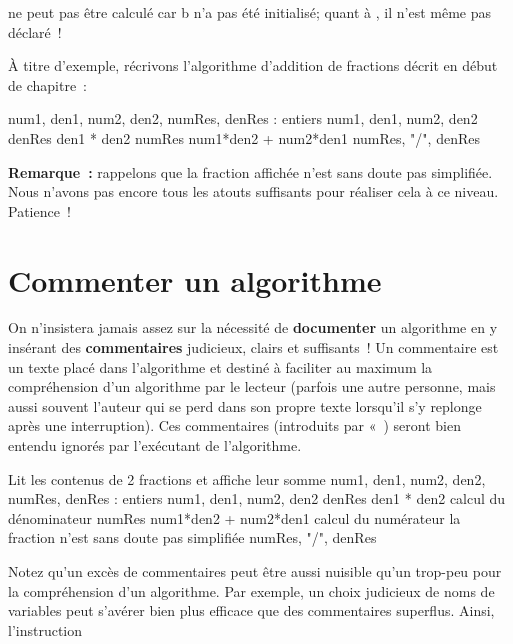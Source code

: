 		 ne peut pas être calculé car b n’a pas été initialisé;
		quant à , il n’est même pas déclaré~!

		\bigskip
			
		À titre d’exemple, récrivons l’algorithme d’addition de fractions décrit
		en début de chapitre~:

		\begin{Pseudocode}
			\Decl num1, den1, num2, den2, numRes, denRes : entiers
			\Read num1, den1, num2, den2
			\Let denRes \Gets den1 * den2
			\Let numRes \Gets num1*den2 + num2*den1
			\Write numRes, "/", denRes
		\EndModule
		\end{Pseudocode}
		
		\textbf{Remarque~:}
		rappelons que la fraction affichée n’est sans doute pas simplifiée. 
		Nous n’avons pas encore tous les atouts suffisants pour réaliser 
		cela à ce niveau. Patience~!

	\section{Commenter un algorithme}

		On n’insistera jamais assez sur la nécessité de \textbf{documenter} un
		algorithme en y insérant des \textbf{commentaires} judicieux, clairs et
		suffisants~! Un commentaire est un texte placé dans
		l’algorithme et destiné à faciliter au maximum la
		compréhension d’un algorithme par le lecteur (parfois une autre
		personne, mais aussi souvent l’auteur qui se perd dans
		son propre texte lorsqu’il s’y replonge après une
		interruption). Ces commentaires (introduits par
		«~) seront bien entendu ignorés par
		l’exécutant de l’algorithme.

		\begin{Pseudocode}
		\LComment Lit les contenus de 2 fractions et affiche leur somme
		\Module{additionnerFractions}{}{}
			\Decl num1, den1, num2, den2, numRes, denRes : entiers
			\Read num1, den1, num2, den2
			\Let denRes \Gets den1 * den2
				\RComment calcul du dénominateur
			\Let numRes \Gets num1*den2 + num2*den1
				\RComment calcul du numérateur
			\Empty \RComment la fraction n’est sans doute pas simplifiée
			\Write numRes, "/", denRes
		\EndModule
		\end{Pseudocode}

		Notez qu’un excès de commentaires peut être aussi nuisible qu’un
		trop-peu pour la compréhension d’un algorithme. Par exemple, un choix
		judicieux de noms de variables peut s’avérer bien plus efficace que des
		commentaires superflus. Ainsi, l’instruction

